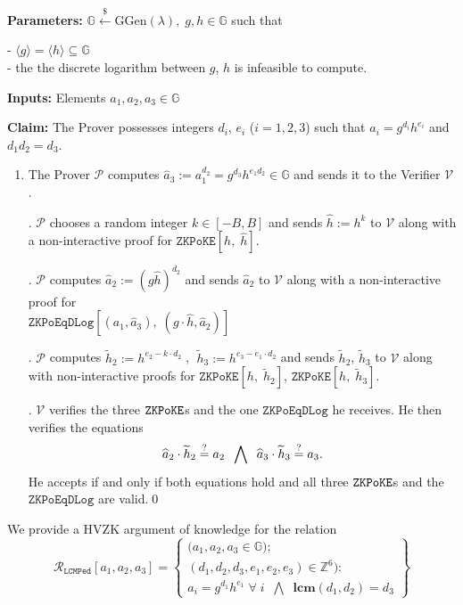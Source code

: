 \documentclass[11pt, lettersize, notitlepage, leqno, footskip=0.6cm]{article}
\newcommand{\ttt}{\texttt}
\newcommand{\bG}{\mathbb{G}}
\newcommand{\la}{\langle}
\newcommand{\ra}{\rangle}
\newcommand{\wti}{\widetilde}
\newcommand{\mc}{\mathcal}
\newcommand{\mb}{\mathbb}
\newcommand{\mbf}{\mathbf}
\newcommand{\mr}{\mathrm}
\newcommand{\lamb}{\lambda}
\newcommand{\what}{\widehat}
\newcommand{\sub}{\subseteq}
\newcommand{\mP}{\mc{P}}
\newcommand{\V}{\mc{V}}
\newcommand{\vs}{\vspace{-0.15cm}}
\newcommand{\noin}{\noindent}
\newcommand{\sta}{\stackrel{?}{=}}
\newcommand{\LCM}{\mbf{lcm}}
\numberwithin{equation}{section}
\begin{document}
\noin \textbf{Parameters:} $\mb{G}\xleftarrow{\$} \mr{GGen}(\lamb), \; g, h\in \mb{G}$ such that

\noin - $\la g \ra = \la h \ra\sub \bG$ \\
\noin - the the discrete logarithm between $g$, $h$ is infeasible to compute.

\noin \textbf{Inputs:} Elements $a_1,a_2,a_3\in \mb{G}$

\noin \textbf{Claim:} The Prover possesses integers $d_i$, $e_i$ ($i=1,2,3$) such that $a_i = g^{d_i}h^{e_i}$ and $d_1d_2 = d_3$.

\begin{enumerate}[wide, labelwidth=!, labelindent=0pt]\vs \item The Prover $\mP$ computes $\what{a}_3:= a_1^{d_2} = g^{d_3}h^{e_1d_2}\in \bG$ and sends it to the Verifier $\V$.

\noin 2. $\mP$ chooses a random integer $k\in [-B, B]$ and sends $\what{h}:= h^k$ to $\V$ along with a non-interactive proof for $\ttt{ZKPoKE}[h,\;\what{h}]$.

\noin 3. $\mP$ computes $\what{a}_2:= (g\what{h})^{d_2}$ and sends $\what{a}_2$ to $\V$ along with a non-interactive proof for\\ $\ttt{ZKPoEqDLog}[(a_1,\what{a}_3),\;(g\cdot\what{h}, \what{a}_2)]$

\noin 4. $\mP$ computes $\wti{h}_2:= h^{e_2-k\cdot d_2}\;$, $\;\wti{h}_3:= h^{e_3-e_1\cdot d_2}$ and sends $\wti{h}_2$, $\wti{h}_3$ to $\V$ along with non-interactive proofs for $\ttt{ZKPoKE}[h,\;\wti{h}_2 ]$, $\ttt{ZKPoKE}[h,\;\wti{h}_3 ]$.

\noin 5. $\V$ verifies the three $\tt{ZKPoKE}$s and the one $\ttt{ZKPoEqDLog}$ he receives. He then verifies the equations \vs $$ \what{a}_2\cdot \wti{h}_2 \sta a_2\;\;\bigwedge\;\;\what{a}_3\cdot \wti{h}_3 \sta a_3. \vs $$ He accepts if and only if both equations hold and all three $\tt{ZKPoKE}$s and the $\ttt{ZKPoEqDLog}$ are valid.\qed \end{enumerate}


We provide a HVZK argument of knowledge for the relation \[
  \mc{R}_{{\ttt{LCMPed}}}[a_1,a_2,a_3] = \left\{\begin{array}{l}
    \big(a_1,a_2,a_3\in\mb{G} \big);\\
    (d_1, d_2,d_3, e_1,e_2,e_3)\in\mb{Z}^6): \\
    a_i = g^{d_1}h^{e_1}\;\forall\;i\;\; \bigwedge\;\; \LCM(d_1,d_2) = d_3   \end{array}\right\}
\] 
\end{document}
